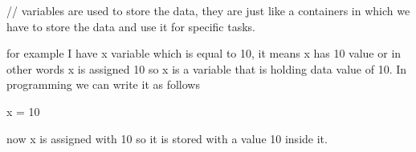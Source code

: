 // variables are used to store the data, they are just like a containers in which we have to store the data and use it for specific tasks.

for example I have x variable which is equal to 10, it means x has 10 value or in other words x is assigned 10 so x is a variable that is holding data value of 10. In programming we can write it as follows

x = 10

now x is assigned with 10 so it is stored with a value 10 inside it. 